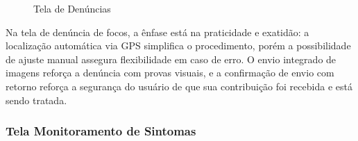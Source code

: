 \documentclass[a4paper, 12pt]{article}
\begin{document}
\begin{figure}[H]
  \centering
  \caption{Tela de Denúncias}
  \label{fig:denuncia}
\end{figure}

Na tela de denúncia de focos, a ênfase está na praticidade e exatidão: a localização automática via GPS simplifica o procedimento, porém a possibilidade de ajuste manual assegura flexibilidade em caso de erro.  O envio integrado de imagens reforça a denúncia com provas visuais, e a confirmação de envio com retorno reforça a segurança do usuário de que sua contribuição foi recebida e está sendo tratada.

\subsubsection{Tela Monitoramento de Sintomas}
\end{document}
